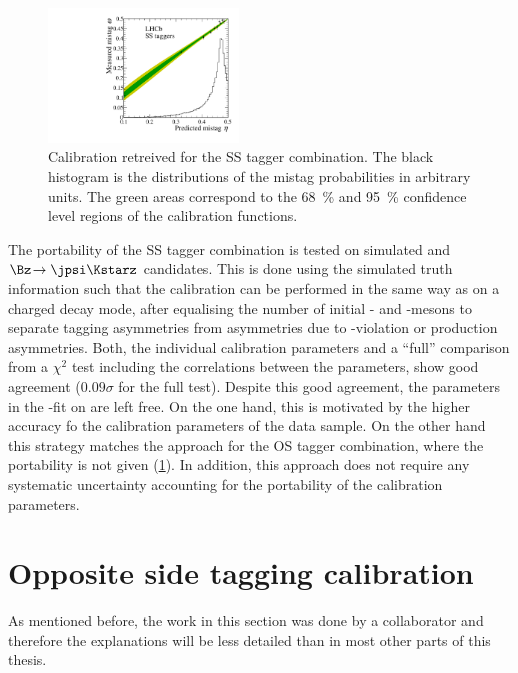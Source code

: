 \begin{figure}[tbp]
	\begin{center}
		\includegraphics[width=0.45\textwidth]{08FlavourTagging/figs/CalibrationSS.pdf}
	\end{center}
	\caption{Calibration retreived for the SS tagger combination.
	The black histogram is the distributions of the mistag probabilities in arbitrary units.
	The green areas correspond to the \SI{68}{\percent} and \SI{95}{\percent} confidence level regions of the calibration functions.}
	\label{fig:CalibSS}
\end{figure}

The portability of the SS tagger combination is tested on simulated \BdToDpi and $\Bz\!\to\jpsi\Kstarz$ candidates.
This is done using the simulated truth information such that the calibration can be performed in the same way as on a charged decay mode, after equalising the number of initial \Bz- and \Bzb-mesons to separate tagging asymmetries from asymmetries due to \CP-violation or production asymmetries.
Both, the individual calibration parameters and a \enquote{full} comparison from a $\chi^2$ test including the correlations between the parameters, show good agreement (\eg $0.09\sigma$ for the full test).
Despite this good agreement, the parameters in the \CP-fit on \BdToDpi are left free.
On the one hand, this is  motivated by the higher accuracy fo the calibration parameters of the \BdToDpi data sample.
On the other hand this strategy matches the approach for the OS tagger combination, where the portability is not given (\cref{sec:OScalibration}).
In addition, this approach does not require any systematic uncertainty accounting for the portability of the calibration parameters.

\section{Opposite side tagging calibration}
\label{sec:OScalibration}

As mentioned before, the work in this section was done by a collaborator and therefore the explanations will be less detailed than in most other parts of this thesis.

